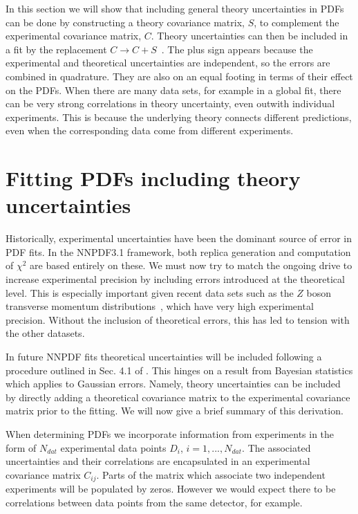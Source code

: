 In this section we will show that including general theory uncertainties in PDFs can be done by constructing a theory covariance matrix, $S$, to complement the experimental covariance matrix, $C$. Theory uncertainties can then be included in a fit by the replacement $C \to C + S$~\cite{Ball:2018odr}. The plus sign appears because the experimental and theoretical uncertainties are independent, so the errors are combined in quadrature. They are also on an equal footing in terms of their effect on the PDFs. When there are many data sets, for example in a global fit, there can be very strong correlations in theory uncertainty, even outwith individual experiments. This is because the underlying theory connects different predictions, even when the corresponding data come from different experiments. 

\section{Fitting PDFs including theory uncertainties}
Historically, experimental uncertainties have been the dominant source of error in PDF fits. 
In the NNPDF3.1 framework, both replica generation and computation of $\chi^2$ 
are based entirely on these. We must now try to match the ongoing drive to 
increase experimental precision by including errors introduced at the theoretical level. This is
especially important given recent data sets such as the $Z$ boson transverse momentum
distributions~\cite{Aad:2014xaa,Khachatryan:2015oaa,Aad:2015auj}, which have very high experimental precision. Without
the inclusion of theoretical errors, this has led to tension with the other datasets.

In future NNPDF fits theoretical uncertainties will be included following a procedure outlined in Sec. 4.1 of \cite{Ball:2018odr}. This hinges on a result from Bayesian statistics
which applies to Gaussian errors. Namely, theory uncertainties can be included by directly 
adding a theoretical
covariance matrix to the experimental covariance matrix prior to the fitting. We will now give a brief summary of this derivation.

When determining PDFs we incorporate information from experiments in the form of $N_{dat}$ experimental data points $D_i$, $i=1,...,N_{dat}$. The associated uncertainties and their correlations are encapsulated in an experimental covariance matrix $C_{ij}$. Parts of the matrix which associate two independent experiments will be populated by zeros. However we would expect there to be correlations between data points from the same detector, for example.


